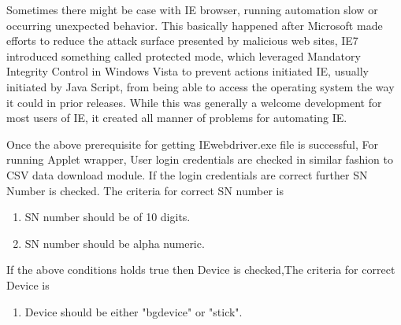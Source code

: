 \documentclass[article,type=msc,colorback,accentcolor=tud9c,twoside,11pt]{tudthesis}
\begin{document}
Sometimes there might be case with IE browser, running automation slow or occurring unexpected behavior. This basically happened after Microsoft made efforts to reduce the attack surface presented by malicious web sites, IE7 introduced something called protected mode, which leveraged Mandatory Integrity Control in Windows Vista to prevent actions initiated IE, usually initiated by Java Script, from being able to access the operating system the way it could in prior releases. While this was generally a welcome development for most users of IE, it created all manner of problems for automating IE.

Once the above prerequisite for getting IEwebdriver.exe file is successful, For running Applet wrapper, User login credentials are checked in similar fashion to CSV data download module. If the login credentials are correct further SN Number is checked. The criteria for correct SN number is
\begin{enumerate}
\item SN number should be of 10 digits.
\item SN number should be alpha numeric.
\end{enumerate}
If the above conditions holds true then Device is checked,The criteria for correct Device is 
\begin{enumerate}
\item Device should be either "bgdevice" or "stick".
\end{enumerate}
\end{document}
